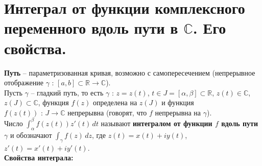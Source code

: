 \newpage
\section{Интеграл от функции комплексного переменного вдоль пути в $\mathbb{C}$. Его свойства.}


\textbf{Путь} -- параметризованная кривая, возможно с самопересечением (непрерывное отображение $\gamma$ : $[a, b]\subset \mathbb{R} \rightarrow \mathbb{C}$).\\[2mm]
Пусть $\gamma$ -- гладкий путь, то есть $\gamma$ : $z = z(t)$, $t \in J = [\alpha, \beta] \subset \mathbb{R}$, $z(t) \in \mathbb{C}$, $z(J) \subset \mathbb{C}$, функция $f(z)$ определена на $z(J)$ и функция \\ 
$f(z(t))$ : $J \rightarrow \mathbb{C}$ непрерывна (говорят, что $f$ непрерывна на $\gamma$).\\
Число \(\int_{\alpha}^{\beta} f(z(t))z'(t) \,dt\) называют \textbf{интегралом от функции $f$ вдоль пути $\gamma$} и обозначают \(\int_{\gamma} f(z) \, dz\), где $z(t) = x(t) + iy(t)$, $z'(t) = x'(t) + iy'(t)$.\\[2mm]
\textbf{Свойства интеграла:}
